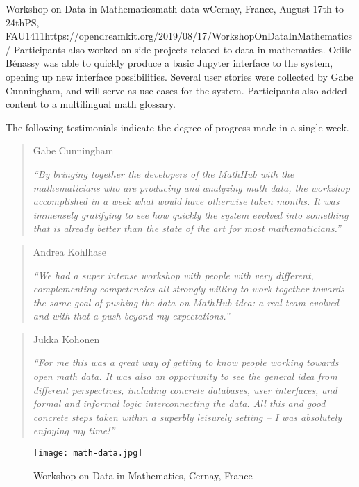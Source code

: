 \begin{event}{Workshop on Data in Mathematics}{math-data-w}{Cernay, France, August 17th to 24th}{PS, FAU}{14}{11}{https://opendreamkit.org/2019/08/17/WorkshopOnDataInMathematics/}
Participants also worked on side projects related to data in mathematics.
Odile Bénassy was able to quickly produce a basic Jupyter interface to the system,
opening up new interface possibilities.
Several user stories were collected by Gabe Cunningham, and will serve as use cases for the system.
Participants also added content to a multilingual math glossary.

The following testimonials indicate the degree of progress made in a single week.

\begin{quote}
Gabe Cunningham

\emph{``By bringing together the developers of the MathHub with the mathematicians who are producing and analyzing math data, the workshop accomplished in a week what would have otherwise taken months. It was immensely gratifying to see how quickly the system evolved into something that is already better than the state of the art for most mathematicians.''}
\end{quote}
\vspace{5mm}

\begin{quote}
Andrea Kohlhase

\emph{``We had a super intense workshop with people with very different, complementing competencies all strongly willing to work together towards the same goal of pushing the data on MathHub idea: a real team evolved and with that a push beyond my expectations.''}
\end{quote}
\vspace{5mm}

\begin{quote}
Jukka Kohonen

\emph{``For me this was a great way of getting to know people working towards open math data. It was also an opportunity to see the general idea from different perspectives, including concrete databases, user interfaces, and formal and informal logic interconnecting the data. All this and good concrete steps taken within a superbly leisurely setting -- I was absolutely enjoying my time!''}
\end{quote}


\begin{figure}[ht]
\texttt{[image: math-data.jpg]}
\caption*{Workshop on Data in Mathematics, Cernay, France}
\end{figure}

\end{event}
